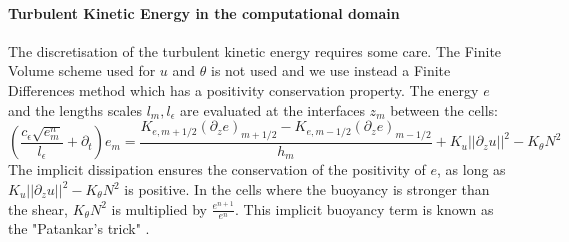 \paragraph{Turbulent Kinetic Energy in the computational domain}
The discretisation of the turbulent kinetic energy
requires some care. The Finite Volume scheme used for
$u$ and $\theta$ is not used and we use instead a Finite Differences
method which has a positivity conservation property.
The energy $e$ and the lengths scales
$l_m, l_\epsilon$ are evaluated at the interfaces
$z_m$ between the cells:
\begin{equation}
\label{eq:ND_StratifiedCase_SemiDiscreteTKE}
    \left(
    \frac{c_\epsilon \sqrt{e^n_m}}{l_\epsilon}
    + \partial_t
    \right) e_m
    =\frac{K_{e,m+1/2} (\partial_z e)_{m+1/2} -
    K_{e,m-1/2} (\partial_z e)_{m-1/2}}{h_{m}}
    + K_u ||\partial_z u||^2
    - K_\theta N^2
\end{equation}
The implicit dissipation ensures the conservation
of the positivity of $e$, as long as
$K_u ||\partial_z u||^2 - K_\theta N^2$ is positive.
In the cells where the buoyancy is stronger than the shear,
$K_\theta N^2$ is multiplied by
$\frac{e^{n+1}}{e^n}$. This implicit buoyancy term is known
as the "Patankar's trick" \citep{lemarie_simplified_2021}.

